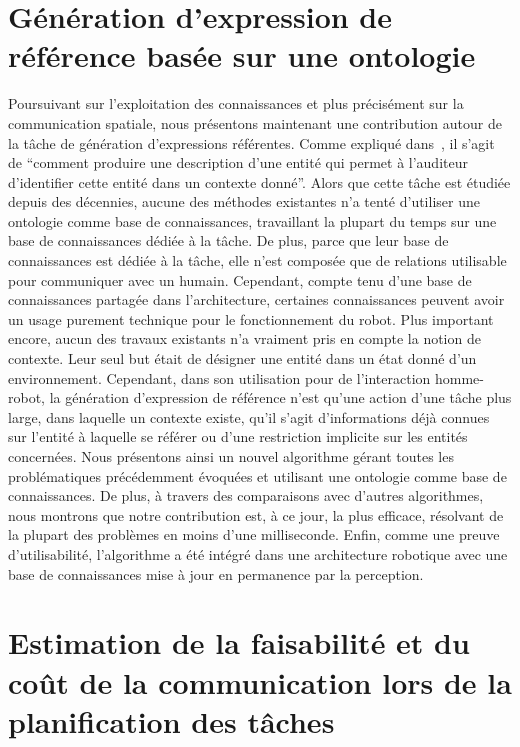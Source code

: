 \section*{Génération d'expression de référence basée sur une ontologie}

Poursuivant sur l'exploitation des connaissances et plus précisément sur la communication spatiale, nous présentons maintenant une contribution autour de la tâche de génération d'expressions référentes. Comme expliqué dans~\cite{reiter_2000_building}, il s'agit de ``comment produire une description d'une entité qui permet à l'auditeur d'identifier cette entité dans un contexte donné''. Alors que cette tâche est étudiée depuis des décennies, aucune des méthodes existantes n'a tenté d'utiliser une ontologie comme base de connaissances, travaillant la plupart du temps sur une base de connaissances dédiée à la tâche. De plus, parce que leur base de connaissances est dédiée à la tâche, elle n'est composée que de relations utilisable pour communiquer avec un humain. Cependant, compte tenu d'une base de connaissances partagée dans l'architecture, certaines connaissances peuvent avoir un usage purement technique pour le fonctionnement du robot. Plus important encore, aucun des travaux existants n'a vraiment pris en compte la notion de contexte. Leur seul but était de désigner une entité dans un état donné d'un environnement. Cependant, dans son utilisation pour de l'interaction homme-robot, la génération d'expression de référence n'est qu'une action d'une tâche plus large, dans laquelle un contexte existe, qu'il s'agit d'informations déjà connues sur l'entité à laquelle se référer ou d'une restriction implicite sur les entités concernées. Nous présentons ainsi un nouvel algorithme gérant toutes les problématiques précédemment évoquées et utilisant une ontologie comme base de connaissances. De plus, à travers des comparaisons avec d'autres algorithmes, nous montrons que notre contribution est, à ce jour, la plus efficace, résolvant de la plupart des problèmes en moins d'une milliseconde. Enfin, comme une preuve d'utilisabilité, l'algorithme a été intégré dans une architecture robotique avec une base de connaissances mise à jour en permanence par la perception. 

\section*{Estimation de la faisabilité et du coût de la communication lors de la planification des tâches}

